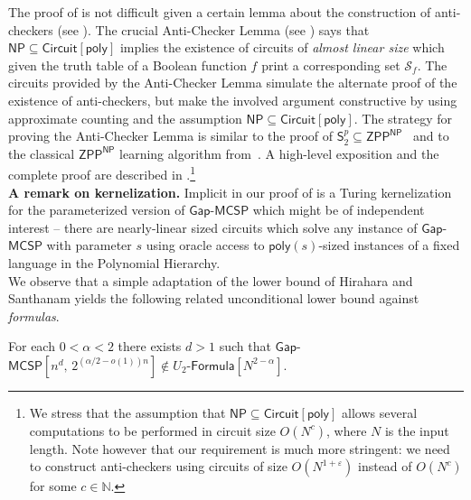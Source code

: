 \documentclass{toc}
\newcommand{\gapmcsp}{\mathsf{Gap}$-$\mathsf{MCSP}}
\begin{document}
The proof of  is not difficult given a certain lemma about the construction of anti-checkers (see ). The crucial Anti-Checker Lemma (see ) says that $\mathsf{NP} \subseteq \mathsf{Circuit}[\mathsf{poly}]$ implies the existence of circuits of \emph{almost linear size} which given the truth table of a Boolean function $f$ print a corresponding set $\mathcal{S}_f$. The circuits provided by the Anti-Checker Lemma simulate the alternate proof of the existence of anti-checkers, but make the involved argument constructive by using approximate counting and the assumption $\mathsf{NP} \subseteq \mathsf{Circuit}[\mathsf{poly}]$. The strategy for proving the Anti-Checker Lemma is similar to the proof of $\mathsf{S}^p_2\subseteq \mathsf{ZPP}^\mathsf{NP}$~\cite{DBLP:journals/jcss/Cai07} and to the classical $\mathsf{ZPP}^\mathsf{NP}$ learning algorithm from~\cite{DBLP:journals/jcss/BshoutyCGKT96}. A high-level exposition and the complete proof are described in .\footnote{We stress that the assumption that $\mathsf{NP} \subseteq \mathsf{Circuit}[\mathsf{poly}]$ allows several computations to be performed in circuit size $O(N^c)$, where $N$ is the input length. Note however that our requirement is much more stringent: we need to construct anti-checkers using circuits of size $O(N^{1 + \varepsilon})$ instead of $O(N^c)$ for some $c \in \mathbb{N}$.}\\



\noindent \textbf{A remark on kernelization.} Implicit in our proof of  is a Turing kernelization for the parameterized
version of $\mathsf{Gap}$-$\mathsf{MCSP}$ which might be of independent interest -- there are nearly-linear sized
circuits which solve any instance of $\mathsf{Gap}$-$\mathsf{MCSP}$ with parameter $s$ using oracle access to $\mathsf{poly}(s)$-sized
instances of a fixed language in the Polynomial Hierarchy.\\


We observe that a simple adaptation of the lower bound of Hirahara and Santhanam \cite[Section 4]{DBLP:conf/coco/HiraharaS17} yields the following related unconditional lower bound against \emph{formulas}.

\begin{theorem}\label{thm:lower_bound_mcsp} For each $0 < \alpha < 2$ there exists $d > 1$ such that $\gapmcsp[n^d,\, 2^{(\alpha/2 - o(1))n}] \notin U_2$-$\mathsf{Formula}[N^{2 - \alpha}]$.
\end{theorem}
\end{document}
